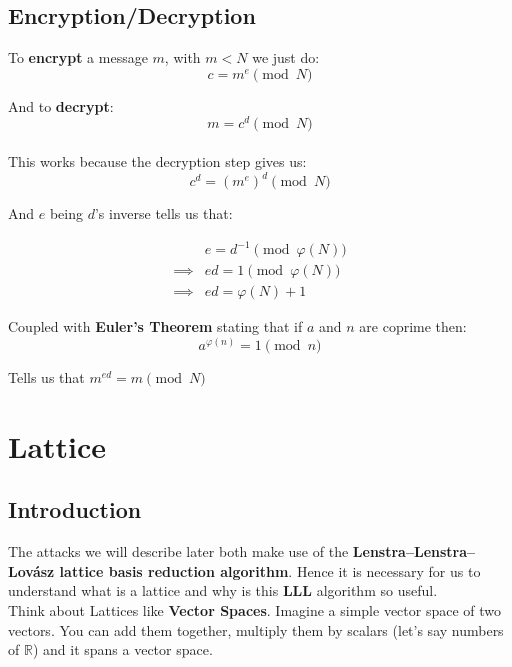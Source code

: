 \documentclass[a4paper,11pt]{article}
\begin{document}
\subsection{Encryption/Decryption}

To \textbf{encrypt} a message $m$, with $m < N$ we just do:
\[ c = m^e \pmod{N} \]

And to \textbf{decrypt}:
\[ m = c^d \pmod{N} \]\\


This works because the decryption step gives us:
\[ c^d = (m^e)^d \pmod{N} \]

And $e$ being $d$'s inverse tells us that:

\begin{align*}
	&e = d^{-1} \pmod{\varphi(N)} \\
	\implies& ed = 1 \pmod{\varphi(N)} \\
	\implies& ed = \varphi(N) + 1
\end{align*}

Coupled with \textbf{Euler's Theorem} stating that if $a$ and $n$ are coprime then:
\[ a^{\varphi(n)} = 1 \pmod{n} \]

Tells us that $m^{ed} = m \pmod{N}$

\section{Lattice}\label{lattice}

\subsection{Introduction}
The attacks we will describe later both make use of the \textbf{Lenstra–Lenstra–Lovász lattice basis reduction algorithm}. Hence it is necessary for us to understand what is a lattice and why is this \textbf{LLL} algorithm so useful.\\
Think about Lattices like \textbf{Vector Spaces}. Imagine a simple vector space of two vectors. You can add them together, multiply them by scalars (let's say numbers of $\mathbb{R}$) and it spans a vector space.

\\
\end{document}
